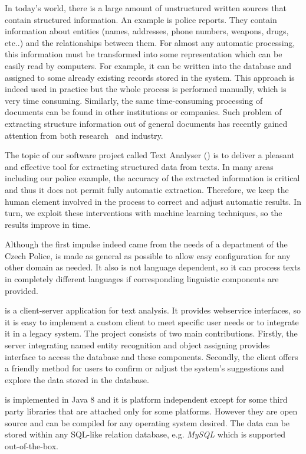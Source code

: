 
In today's world, there is a large amount of unstructured written sources that
contain structured information. An example is police reports. They contain
information about entities (names, addresses, phone numbers, weapons, drugs,
etc..) and the relationships between them. For almost any automatic processing,
this information must be transformed into some representation which can be
easily read by computers. For example, it can be written into the database and
assigned to some already existing records stored in the system. This approach is
indeed used in practice but the whole process is performed manually, which is
very time consuming. Similarly, the same time-consuming processing of documents
can be found in other institutions or companies. Such problem of extracting
structure information out of general documents has recently gained attention
from both research~\cite{ejem14} and industry.

The topic of our software project called Text Analyser (\textan{}) is to
deliver a pleasant and effective tool for extracting structured data from texts.
In many areas including our police example, the accuracy of the extracted
information is critical and thus it does not permit fully automatic extraction.
Therefore, we keep the human element involved in the process to correct and
adjust automatic results. In turn, we exploit these interventions with machine
learning techniques, so the results improve in time.

Although the first impulse indeed came from the needs of a department of the
Czech Police, \textan{} is made as general as possible to allow easy 
configuration for any other domain as needed. It also is not language dependent,
so it can process texts in completely different languages if corresponding
linguistic components are provided.

\textan{} is a client-server application for text analysis. It provides
webservice interfaces, so it is easy to implement a custom client to meet
specific user needs or to integrate it in a legacy system. The project
consists of two main contributions. Firstly, the server integrating named entity
recognition and object assigning provides interface to access the database and
these components. Secondly, the client offers a friendly method for users to
confirm or adjust the system's suggestions and explore the data stored in the
database.

\textan{} is implemented in Java 8 and it is platform independent except for
some third party libraries that are attached only for some platforms. However
they are open source and can be compiled for any operating system desired. The
data can be stored within any SQL-like relation database, e.g. \emph{MySQL} which
is supported out-of-the-box.
